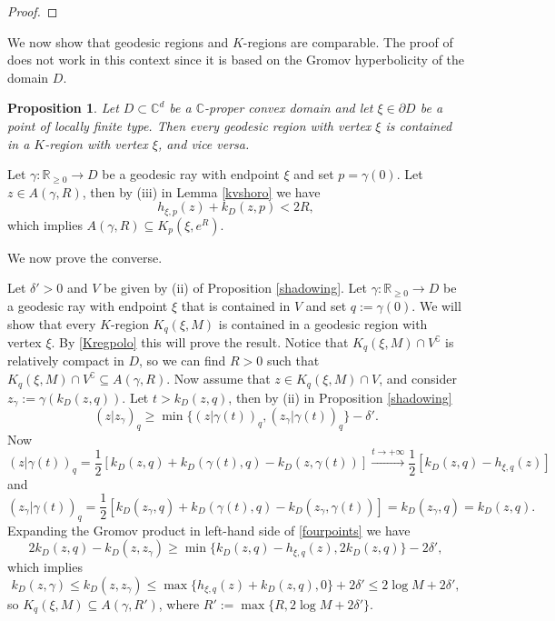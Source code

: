 \documentclass[11pt, reqno]{amsart}
\numberwithin{equation}{section}
\newtheorem{proposition}[theorem]{Proposition}
\theoremstyle{definition}
\newcommand{\C}{\mathbb{C}}
\newcommand{\R}{\mathbb{R}}
\begin{document}
{\begin{proof}
			
		\end{proof}
		
		We now show that geodesic regions and $K$-regions are comparable. The proof of \cite[Lemma 7.8]{AAG}
		does not work in this context since it is based on the Gromov hyperbolicity of the domain $D$.
		
		\begin{proposition}\label{abatek}
			Let $D\subset\C^d$ be a $\C$-proper convex domain and let $\xi\in\partial D$ be a point of locally finite type. Then every geodesic region with vertex $\xi$ is contained in a $K$-region with vertex $\xi$, and vice versa.
		\end{proposition}
		
		\proof
		Let $\gamma\colon\R_{\geq 0}\to D$ be a geodesic ray with endpoint $\xi$ and set $p=\gamma(0)$. Let $z\in A(\gamma,R)$, then by (iii) in Lemma \ref{kvshoro} we have
		$$h_{\xi,p}(z)+k_D(z,p)<2R,$$
		which implies $A(\gamma,R)\subseteq K_p(\xi,e^R)$.
		
		We now prove the converse. 
		
		Let $\delta'>0$ and $V$ be given by (ii) of Proposition \ref{shadowing}. 
		Let $\gamma\colon\R_{\geq 0}\to D$ be a geodesic ray with endpoint $\xi$ that is contained in $V$ and set $q:=\gamma(0)$.
		We will show that every $K$-region $K_q(\xi,M)$ is contained in a geodesic region with vertex $\xi$. By 
		\eqref{Kregpolo} this will prove the result.
		Notice that $K_q(\xi,M)\cap V^\complement$ is relatively compact in $D$, so we can find $R>0$ such that $ K_q(\xi,M)\cap V^\complement\subseteq A(\gamma,R)$. Now assume that $z\in K_q(\xi,M)\cap V$,  and consider $z_\gamma:=\gamma(k_D(z,q))$. Let $t>k_D(z,q)$, then by (ii) in Proposition \ref{shadowing}
		\begin{equation}\label{fourpoints}
			(z|z_\gamma)_q\geq\min\{(z|\gamma(t))_q,(z_\gamma|\gamma(t))_q\}-\delta'.
		\end{equation}
		Now
		$$(z|\gamma(t))_q=\frac{1}{2}[k_D(z,q)+k_D(\gamma(t),q)-k_D(z,\gamma(t))]\stackrel{t\to+\infty}\longrightarrow \frac{1}{2}[k_D(z,q)-h_{\xi,q}(z)]$$
		and
		$$(z_\gamma|\gamma(t))_q=\frac{1}{2}[k_D(z_\gamma,q)+k_D(\gamma(t),q)-k_D(z_\gamma,\gamma(t))]=k_D(z_\gamma,q)=k_D(z,q).$$
		Expanding the Gromov product in left-hand side of \eqref{fourpoints} we have
		$$2k_D(z,q)-k_D(z,z_\gamma)\geq\min\{k_D(z,q)-h_{\xi,q}(z),2k_D(z,q)\}-2\delta',$$
		which implies
		$$k_D(z,\gamma)\leq k_D(z,z_\gamma)\leq\max\{h_{\xi,q}(z)+k_D(z,q),0\}+2\delta'\leq2\log M+2\delta',$$
		so $K_q(\xi,M)\subseteq A(\gamma,R')$, where $R':=\max\{R,2\log M+2\delta'\}.$
		\endproof
		
}
\end{document}
